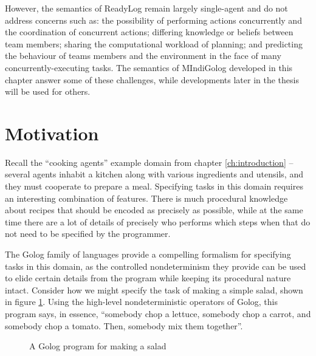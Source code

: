 However, the semantics of ReadyLog remain largely single-agent and
do not address concerns such as: the possibility of performing actions
concurrently and the coordination of concurrent actions; differing
knowledge or beliefs between team members; sharing the computational
workload of planning; and predicting the behaviour of teams members
and the environment in the face of many concurrently-executing tasks.
The semantics of MIndiGolog developed in this chapter answer some
of these challenges, while developments later in the thesis will be
used for others.


\section{Motivation\label{sec:MIndiGolog:Motivation}}

Recall the {}``cooking agents'' example domain from chapter \ref{ch:introduction}
-- several agents inhabit a kitchen along with various ingredients
and utensils, and they must cooperate to prepare a meal. Specifying
tasks in this domain requires an interesting combination of features.
There is much procedural knowledge about recipes that should be encoded
as precisely as possible, while at the same time there are a lot of
details of precisely who performs which steps when that do not need
to be specified by the programmer.

The Golog family of languages provide a compelling formalism for specifying
tasks in this domain, as the controlled nondeterminism they provide
can be used to elide certain details from the program while keeping
its procedural nature intact. Consider how we might specify the task
of making a simple salad, shown in figure \ref{fig:MIndiGolog:MakeSalad}.
Using the high-level nondeterministic operators of Golog, this program
says, in essence, {}``somebody chop a lettuce, somebody chop a carrot,
and somebody chop a tomato. Then, somebody mix them together''.

%
\begin{figure}
\begin{centering}
\par\end{centering}

\caption{A Golog program for making a salad\label{fig:MIndiGolog:MakeSalad}}

\end{figure}


